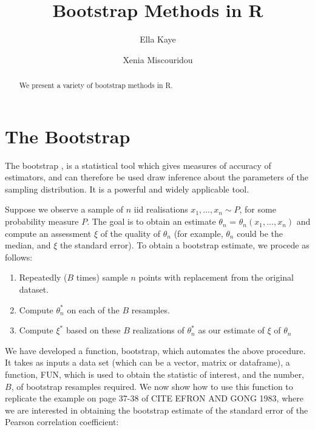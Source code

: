 \documentclass{article}\usepackage[]{graphicx}\usepackage[]{color}
\title{Bootstrap Methods in R}
\author{Ella Kaye \and Xenia Miscouridou}
\begin{document}
\maketitle

\begin{abstract}
We present a variety of bootstrap methods in R.
\end{abstract}

\section{The Bootstrap}
The bootstrap \parencite{Efron1979}, is a statistical tool which gives measures of accuracy of estimators, and can therefore be used draw inference about the parameters of the sampling distribution. It is a powerful and widely applicable tool.

Suppose we observe a sample of $n$ iid realisations  $x_1,\ldots, x_n \sim P$, for some probability measure $P$. The goal is to obtain an estimate $\theta_n$ = $\theta_n(x_1, . . . , x_n)$ and compute an assessment $\xi$ of the quality of $\theta_n$ (for example, $\theta_n$ could be the median, and $\xi$ the standard error). To obtain a bootstrap estimate, we procede as follows:

\begin{enumerate}
\item Repeatedly ($B$ times) sample $n$ points with replacement from the original
dataset.
\item Compute $\theta_n^*$ on each of the $B$ resamples.
\item Compute $\xi^*$ based on these $B$ realizations of $\theta_n^*$ as our estimate of $\xi$ of $\theta_n$
\end{enumerate}

We have developed a function, bootstrap, which automates the above procedure. It takes as inputs a data set (which can be a vector, matrix or dataframe), a function, FUN, which is used to obtain the statistic of interest, and the number, $B$, of bootstrap resamples required. We now show how to use this function to replicate the example on page 37-38 of CITE EFRON AND GONG 1983, where we are interested in obtaining the bootstrap estimate of the standard error of the Pearson correlation coefficient:
\end{document}

